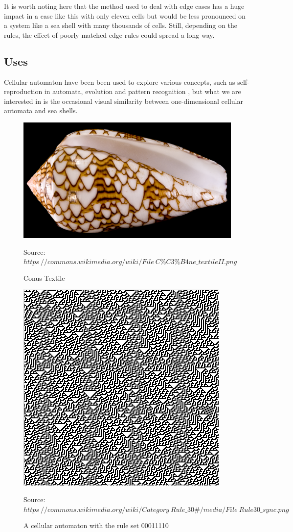 \documentclass[a4paper,11pt]{report}
\begin{document}
It is worth noting here that the method used to deal with edge cases has a huge impact in a case like this with only eleven cells but would be less pronounced on a system like a sea shell with many thousands of cells. Still, depending on the rules, the effect of poorly matched edge rules could spread a long way.

\subsection{Uses}

Cellular automaton have been been used to explore various concepts, such as self-reproduction in automata, evolution and pattern recognition \cite{tessellation}, but what we are interested in is the occasional visual similarity between one-dimensional cellular automata and sea shells.

\begin{figure}[H]
 \centering
 \includegraphics[scale=0.5]{images/conus_textile.png}
  \caption*{Source: $https\://commons.wikimedia.org/wiki/File\:C\%C3\%B4ne\_textileII.png$}
  \caption{Conus Textile}
\end{figure}
 
\begin{figure}[H]
 \centering
 \includegraphics[scale=0.7]{images/ca_00011110.png}
 \caption*{Source: $https\://commons.wikimedia.org/wiki/Category\:Rule\_30\#/media/File\:Rule30\_sync.png$}
 \caption{A cellular automaton with the rule set 00011110}
\end{figure}
\end{document}
